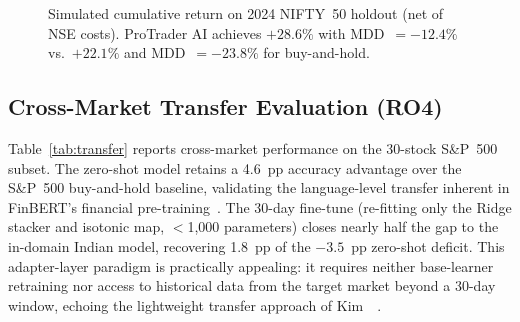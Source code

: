 \begin{figure}[t]
\centering
{}
\caption{Simulated cumulative return on 2024 NIFTY~50 holdout (net of NSE costs).
ProTrader AI achieves $+28.6\%$ with MDD~$=-12.4\%$ vs.\ $+22.1\%$ and
MDD~$=-23.8\%$ for buy-and-hold.}
\label{fig:equity}
\end{figure}

\subsection{Cross-Market Transfer Evaluation (RO4)}

Table~\ref{tab:transfer} reports cross-market performance on the 30-stock
S\&P~500 subset. The zero-shot model retains a 4.6~pp accuracy advantage
over the S\&P~500 buy-and-hold baseline, validating the language-level
transfer inherent in FinBERT's financial pre-training~\cite{li2018sentimental}.
The 30-day fine-tune (re-fitting only the Ridge stacker and isotonic map,
$<$1{,}000 parameters) closes nearly half the gap to the in-domain Indian model,
recovering 1.8~pp of the $-3.5$~pp zero-shot deficit. This adapter-layer
paradigm is practically appealing: it requires neither base-learner retraining
nor access to historical data from the target market beyond a 30-day window,
echoing the lightweight transfer approach of Kim~\etal~\cite{kim2020predicting}.

